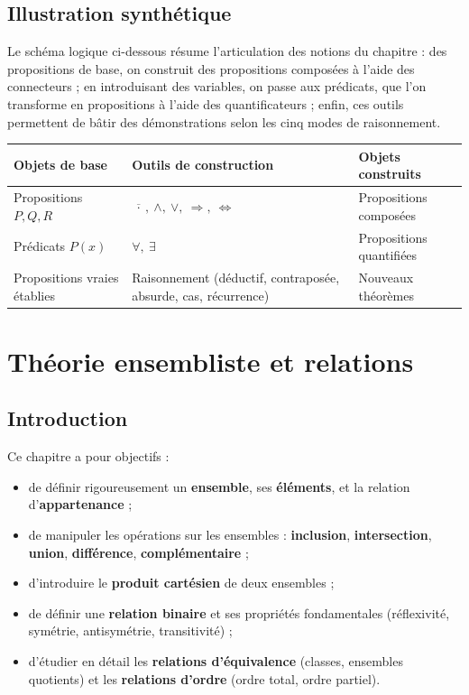 \documentclass[a4paper,12pt,openany]{book}
\begin{document}
\section{Illustration synthétique}

Le schéma logique ci-dessous résume l'articulation des notions du chapitre :
des propositions de base, on construit des propositions composées à l'aide des
connecteurs ; en introduisant des variables, on passe aux prédicats, que l'on
transforme en propositions à l'aide des quantificateurs ; enfin, ces outils
permettent de bâtir des démonstrations selon les cinq modes de raisonnement.

\begin{center}
\begin{tabular}{|>{\centering\arraybackslash}p{4.2cm}|>{\centering\arraybackslash}p{4.2cm}|>{\centering\arraybackslash}p{4.2cm}|}
\hline
\textbf{Objets de base} & \textbf{Outils de construction} & \textbf{Objets construits}\\
\hline
Propositions $P,Q,R$ & $\overline{\ \cdot\ },\ \wedge,\ \vee,\ \Rightarrow,\ \Leftrightarrow$ & Propositions composées\\
\hline
Prédicats $P(x)$ & $\forall,\ \exists$ & Propositions quantifiées\\
\hline
Propositions vraies établies & Raisonnement (déductif, contraposée, absurde, cas, récurrence) & Nouveaux théorèmes\\
\hline
\end{tabular}
\end{center}


\chapter{Théorie ensembliste et relations}

\section{Introduction}


Ce chapitre a pour objectifs :
\begin{itemize}
  \item de définir rigoureusement un \textbf{ensemble}, ses
  \textbf{éléments}, et la relation d'\textbf{appartenance} ;
  \item de manipuler les opérations sur les ensembles : \textbf{inclusion},
  \textbf{intersection}, \textbf{union}, \textbf{différence},
  \textbf{complémentaire} ;
  \item d'introduire le \textbf{produit cartésien} de deux ensembles ;
  \item de définir une \textbf{relation binaire} et ses propriétés
  fondamentales (réflexivité, symétrie, antisymétrie, transitivité) ;
  \item d'étudier en détail les \textbf{relations d'équivalence} (classes,
  ensembles quotients) et les \textbf{relations d'ordre} (ordre total,
  ordre partiel).
\end{itemize}
\end{document}
